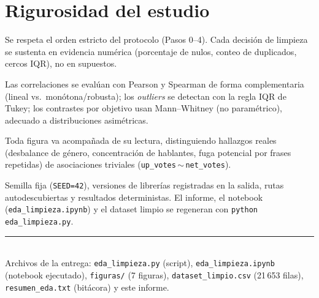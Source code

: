 \documentclass[11pt,a4paper]{article}
\begin{document}
\section{Rigurosidad del estudio}
\begin{description}[leftmargin=0pt,itemsep=2pt]
  \item[\textcolor{g0}{Metodológica.}] Se respeta el orden estricto del protocolo (Pasos 0--4). Cada
  decisión de limpieza se sustenta en evidencia numérica (porcentaje de nulos, conteo de duplicados,
  cercos IQR), no en supuestos.
  \item[\textcolor{g0}{Teórica.}] Las correlaciones se evalúan con Pearson y Spearman de forma
  complementaria (lineal vs.\ monótona/robusta); los \emph{outliers} se detectan con la regla IQR de
  Tukey; los contrastes por objetivo usan Mann--Whitney (no paramétrico), adecuado a distribuciones
  asimétricas.
  \item[\textcolor{g0}{Interpretativa.}] Toda figura va acompañada de su lectura, distinguiendo
  hallazgos reales (desbalance de género, concentración de hablantes, fuga potencial por frases
  repetidas) de asociaciones triviales (\texttt{up\_votes}\,$\sim$\,\texttt{net\_votes}).
  \item[\textcolor{g0}{Replicabilidad.}] Semilla fija (\texttt{SEED=42}), versiones de librerías
  registradas en la salida, rutas autodescubiertas y resultados deterministas. El informe, el notebook
  (\texttt{eda\_limpieza.ipynb}) y el dataset limpio se regeneran con \texttt{python eda\_limpieza.py}.
\end{description}

\vspace{4pt}
\noindent\rule{\linewidth}{0.4pt}\\[-2pt]
{\footnotesize Archivos de la entrega: \texttt{eda\_limpieza.py} (script), \texttt{eda\_limpieza.ipynb}
(notebook ejecutado), \texttt{figuras/} (7 figuras), \texttt{dataset\_limpio.csv} (21\,653 filas),
\texttt{resumen\_eda.txt} (bitácora) y este informe.}
\end{document}

